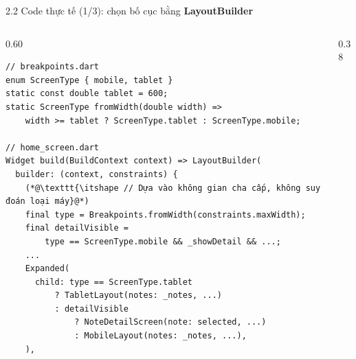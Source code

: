 \documentclass[aspectratio=169,10pt]{beamer}
\newcommand{\api}[1]{\texttt{\bfseries #1}}   %
\begin{document}
\begin{frame}[fragile]{2.2 Code thực tế (1/3): chọn bố cục bằng \textbf{LayoutBuilder}}
  \begin{columns}[T]
    \begin{column}{0.60\textwidth}
\begin{lstlisting}[basicstyle=\ttfamily\fontsize{6.0}{7.0}\selectfont]
// breakpoints.dart
enum ScreenType { mobile, tablet }
static const double tablet = 600;
static ScreenType fromWidth(double width) =>
    width >= tablet ? ScreenType.tablet : ScreenType.mobile;

// home_screen.dart
Widget build(BuildContext context) => LayoutBuilder(
  builder: (context, constraints) {
    (*@\texttt{\itshape // Dựa vào không gian cha cấp, không suy đoán loại máy}@*)
    final type = Breakpoints.fromWidth(constraints.maxWidth);
    final detailVisible =
        type == ScreenType.mobile && _showDetail && ...;
    ...
    Expanded(
      child: type == ScreenType.tablet
          ? TabletLayout(notes: _notes, ...)
          : detailVisible
              ? NoteDetailScreen(note: selected, ...)
              : MobileLayout(notes: _notes, ...),
    ),
\end{lstlisting}
    \end{column}
    \begin{column}{0.38\textwidth}
      \footnotesize
    \end{column}
  \end{columns}
\end{frame}
\end{document}

